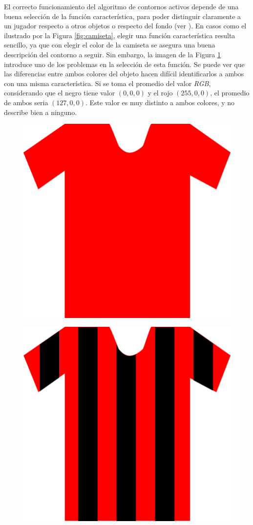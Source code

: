 El correcto funcionamiento del algoritmo de contornos activos depende de una
buena selección de la función característica, para poder distinguir claramente
a un jugador respecto a otros objetos o respecto del fondo (ver
\cite{fast-level-set}). En casos como el ilustrado por la Figura
\ref{fig:camiseta}, elegir una función característica resulta sencillo, ya que
con elegir el color de la camiseta se asegura una buena descripción del
contorno a seguir. Sin embargo, la imagen de la Figura
\ref{fig:camiseta-rayada} introduce uno de los problemas en la selección de
esta función. Se puede ver que las diferencias entre ambos colores del objeto
hacen difícil identificarlos a ambos con una misma característica. Si se toma
el promedio del valor \textit{RGB}, considerando que el negro tiene valor 
$(0, 0, 0)$ y el rojo $(255, 0, 0)$, el promedio de ambos seria $(127, 0, 0)$.
Este valor es muy distinto a ambos colores, y no describe bien a ninguno.

\begin{figure}[H]
    \centering
    \begin{minipage}[t]{.5\textwidth}
        \centering
        \includegraphics[width=.4\linewidth]{./images/rect2995.png}
        \label{fig:camiseta}
    \end{minipage}%
    \begin{minipage}[t]{.5\textwidth}
        \centering
        \includegraphics[width=.4\linewidth]{./images/rect2996.png}
        \label{fig:camiseta-rayada}
    \end{minipage}
\end{figure}

